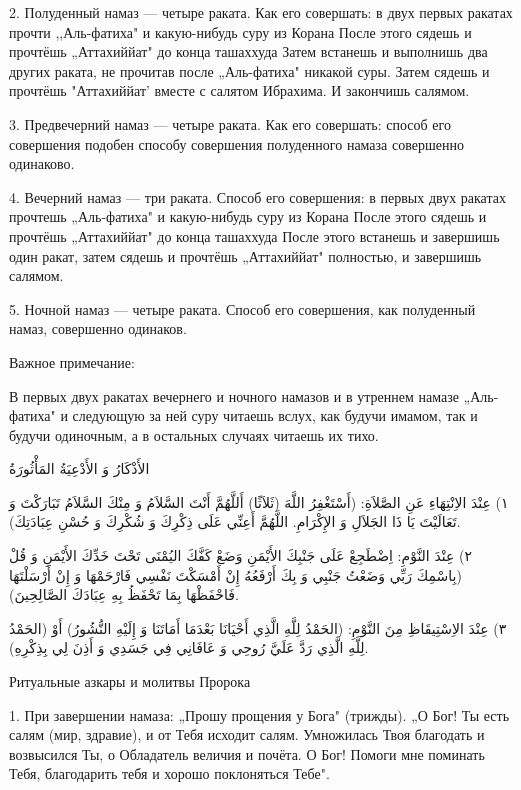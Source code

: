 \documentclass[a5paper]{article}
\begin{document}
2. Полуденный намаз — четыре раката. Как его совершать: в двух первых ракатах прочти ,,Аль-фатиха" и какую-нибудь суру из Корана После этого сядешь и прочтёшь „Аттахиййат" до конца ташаххуда Затем встанешь и выполнишь два других раката, не прочитав после „Аль-фатиха" никакой суры. Затем сядешь и прочтёшь "Аттахиййат' вместе с салятом Ибрахима. И закончишь салямом.

3. Предвечерний намаз — четыре раката. Как его совершать: способ его совершения подобен способу совершения полуденного намаза совершенно одинаково.

4. Вечерний намаз — три раката. Способ его совершения: в первых двух ракатах прочтешь „Аль-фатиха" и какую-нибудь суру из Корана После этого сядешь и прочтёшь „Аттахиййат" до конца ташаххуда После этого встанешь и завершишь один ракат, затем сядешь и прочтёшь „Аттахиййат" полностью, и завершишь салямом.

5. Ночной намаз — четыре раката. Способ его совершения, как полуденный намаз, совершенно одинаков.

Важное примечание:

В первых двух ракатах вечернего и ночного намазов и в утреннем намазе „Аль-фатиха" и следующую за ней суру читаешь вслух, как будучи имамом, так и будучи одиночным, а в остальных случаях читаешь их тихо.

الأَذْكَارُ وَ الأَدْعِيَةُ المَأْثُورَةُ

١) عِنْدَ الاِنْتِهَاءِ عَنِ الصَّلاَةِ: (أَسْتَغْفِرُ اللَّهَ (ثَلاَثًا) أَللَّهُمَّ أَنْتَ السَّلاَمُ وَ مِنْكَ السَّلاَمُ تَبَارَكْتَ وَ تَعَالَيْتَ يَا ذَا الجَلاَلِ وَ الإِكْرَامِ. اللَّهُمَّ أَعِنِّي عَلَى ذِكْرِكَ وَ شُكْرِكَ وَ حُسْنِ عِبَادَتِكَ).

٢) عِنْدَ النَّوْمِ: اِضْطَجِعْ عَلَى جَنْبِكَ الأَيْمَنِ وَضَعْ كَفَّكَ اليُمْنَى تَحْتَ خَدِّكَ الأَيْمَنِ وَ قُلْ (بِاسْمِكَ رَبِّي وَضَعْتُ جَنْبِي وَ بِكَ أَرْفَعُهُ إِنْ أَمْسَكْتَ نَفْسِي فَارْحَمْهَا وَ إِنْ أَرْسَلْتَهَا فَاحْفَظْهَا بِمَا تَحْفَظُ بِهِ عِبَادَكَ الصَّالِحِينَ).

٣) عِنْدَ الاِسْتِيقَاظِ مِنَ النَّوْمِ: (الحَمْدُ لِلَّهِ الَّذِي أَحْيَانَا بَعْدَمَا أَمَاتَنَا وَ إِلَيْهِ النُّشُورُ) أَوْ (الحَمْدُ لِلَّهِ الَّذِي رَدَّ عَلَيَّ رُوحِي وَ عَافَانِي فِي جَسَدِي وَ أَذِنَ لِي بِذِكْرِهِ).

Ритуальные азкары и молитвы Пророка

1. При завершении намаза: „Прошу прощения у Бога" (трижды). „О Бог! Ты есть салям (мир, здравие), и от Тебя исходит салям. Умножилась Твоя благодать и возвысился Ты, о Обладатель величия и почёта. О Бог! Помоги мне поминать Тебя, благодарить тебя и хорошо поклоняться Тебе".
\end{document}
